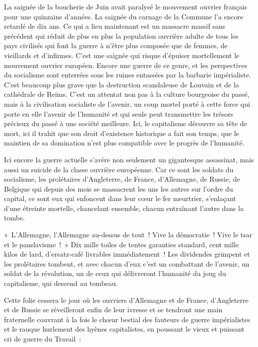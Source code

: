 \documentclass[french,twoside]{book} %
\begin{document}
La saignée de la boucherie de Juin avait paralysé le mouvement ouvrier français pour une quinzaine d’années. La saignée du carnage de la Commune l’a encore retardé de dix ans. Ce qui a lieu maintenant est un massacre massif sans précédent qui réduit de plus en plus la population ouvrière adulte de tous les pays civilisés qui font la guerre à n’être plus composée que de femmes, de vieillards et d’infirmes. C'est une saignée qui risque d’épuiser mortellement le mouvement ouvrier européen. Encore une guerre de ce genre, et les perspectives du socialisme sont enterrées sous les ruines entassées par la barbarie impérialiste. C'est beaucoup plus grave que la destruction scandaleuse de Louvain et de la cathédrale de Reims. C'est un attentat non pas à la culture bourgeoise du passé, mais à la civilisation socialiste de l’avenir, un coup mortel porté à cette force qui porte en elle l’avenir de l’humanité et qui seule peut transmettre les trésors précieux du passé à une société meilleure. Ici, le capitalisme découvre sa tête de mort, ici il trahit que son droit d’existence historique a fait son temps, que le maintien de sa domination n’est plus compatible avec le progrès de l’humanité.\par
Ici encore la guerre actuelle s’avère non seulement un gigantesque assassinat, mais aussi un suicide de la classe ouvrière européenne. Car ce sont les soldats du socialisme, les prolétaires d’Angleterre, de France, d’Allemagne, de Russie, de Belgique qui depuis des mois se massacrent les uns les autres sur l’ordre du capital, ce sont eux qui enfoncent dans leur cœur le fer meurtrier, s’enlaçant d’une étreinte mortelle, chancelant ensemble, chacun entraînant l’autre dans la tombe.\par
« L'Allemagne, l’Allemagne au-dessus de tout ! Vive la démocratie ! Vive le tsar et le panslavisme ! » Dix mille toiles de tentes garanties standard, cent mille kilos de lard, d’ersatz-café livrables immédiatement ! Les dividendes grimpent et les prolétaires tombent, et avec chacun d’eux c’est un combattant de l’avenir, un soldat de la révolution, un de ceux qui délivreront l’humanité du joug du capitalisme, qui descend au tombeau.\par
Cette folie cessera le jour où les ouvriers d’Allemagne et de France, d’Angleterre et de Russie se réveilleront enfin de leur ivresse et se tendront une main fraternelle couvrant à la fois le chœur bestial des fauteurs de guerre impérialistes et le rauque hurlement des hyènes capitalistes, en poussant le vieux et puissant cri de guerre du Travail :\par
\end{document}
